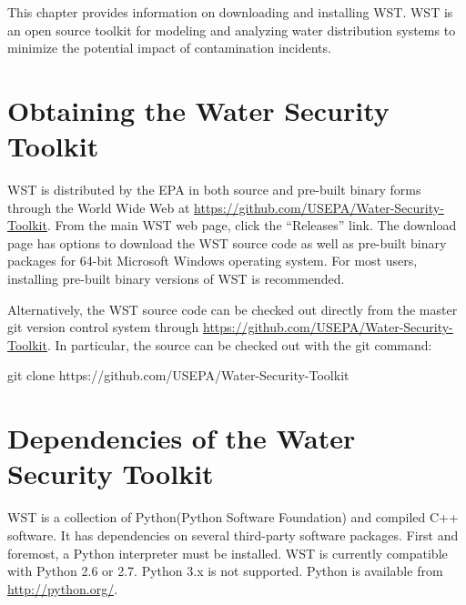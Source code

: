 
This chapter provides information on downloading and
installing WST. WST is an open source toolkit for
modeling and analyzing water distribution systems to minimize the
potential impact of contamination incidents.

\section{Obtaining the Water Security Toolkit}\label{S:getting_wst}

WST is distributed by the EPA in both source and
pre-built binary forms through the World Wide Web at
\url{https://github.com/USEPA/Water-Security-Toolkit}. From the main WST web page,
click the ``Releases'' link. The download page 
has options to download the WST source code as well as pre-built binary
packages for 64-bit Microsoft Windows\textsuperscript{\textregistered} operating system. For most users, 
installing pre-built binary versions of WST is recommended.

Alternatively, the WST source code can be checked out directly from the
master git version control system through
\url{https://github.com/USEPA/Water-Security-Toolkit}. In particular, the
source can be checked out with the git command:
\begin{unknownListing}
git clone https://github.com/USEPA/Water-Security-Toolkit
\end{unknownListing}

\section{Dependencies of the Water Security Toolkit}\label{dependencies}

WST is a collection of Python\texttrademark (Python Software Foundation) and compiled C++ software. It has
dependencies on several third-party software packages. First and
foremost, a Python interpreter must be installed. WST is
currently compatible with Python 2.6 or 2.7. Python 3.x is not 
supported. Python is available from \url{http://python.org/}.

